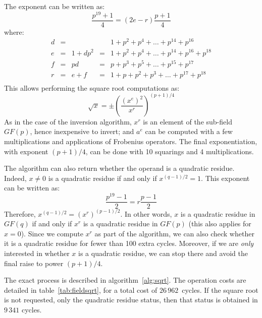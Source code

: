 \documentclass{llncs}
\newcommand{\GF}{GF}
\begin{document}
The exponent can be written as:
\begin{equation*}
    \frac{p^{19}+1}{4} = (2e - r) \frac{p+1}{4}
\end{equation*}
where:
\begin{equation*}
    \begin{array}{rclcl}
        d &=&          & & 1 + p^2 + p^4 + \dots + p^{14} + p^{16} \\
        e &=& 1 + dp^2 &=& 1 + p^2 + p^4 + \dots + p^{14} + p^{16} + p^{18} \\
        f &=& pd       &=& p + p^3 + p^5 + \dots + p^{15} + p^{17} \\
        r &=& e + f    &=& 1 + p + p^2 + p^3 + \dots + p^{17} + p^{18} \\
    \end{array}
\end{equation*}
This allows performing the square root computations as:
\begin{equation*}
    \sqrt{x} = \pm \left( \frac{(x^e)^2}{x^r} \right)^{(p+1)/4}
\end{equation*}
As in the case of the inversion algorithm, $x^r$ is an element of the
sub-field $\GF(p)$, hence inexpensive to invert; and $a^e$ can be
computed with a few multiplications and applications of Frobenius
operators. The final exponentiation, with exponent $(p+1)/4$, can be
done with 10 squarings and 4 multiplications.

The algorithm can also return whether the operand is a quadratic residue.
Indeed, $x\neq 0$ is a quadratic residue if and only if $x^{(q-1)/2} = 1$.
This exponent can be written as:
\begin{equation*}
    \frac{p^{19}-1}{2} = r \frac{p-1}{2}
\end{equation*}
Therefore, $x^{(q-1)/2} = (x^r)^{(p-1)/2}$. In other words, $x$ is a
quadratic residue in $\GF(q)$ if and only if $x^r$ is a quadratic
residue in $\GF(p)$ (this also applies for $x = 0$). Since we compute
$x^r$ as part of the algorithm, we can also check whether it is a
quadratic residue for fewer than 100 extra cycles. Moreover, if we
are \emph{only} interested in whether $x$ is a quadratic residue, we
can stop there and avoid the final raise to power $(p+1)/4$.

The exact process is described in algorithm~\ref{alg:sqrt}. The
operation costs are detailed in table~\ref{tab:fieldsqrt}, for a total
cost of $26\,962$~cycles. If the square root is not requested, only the
quadratic residue status, then that status is obtained in $9\,341$
cycles.
\end{document}
